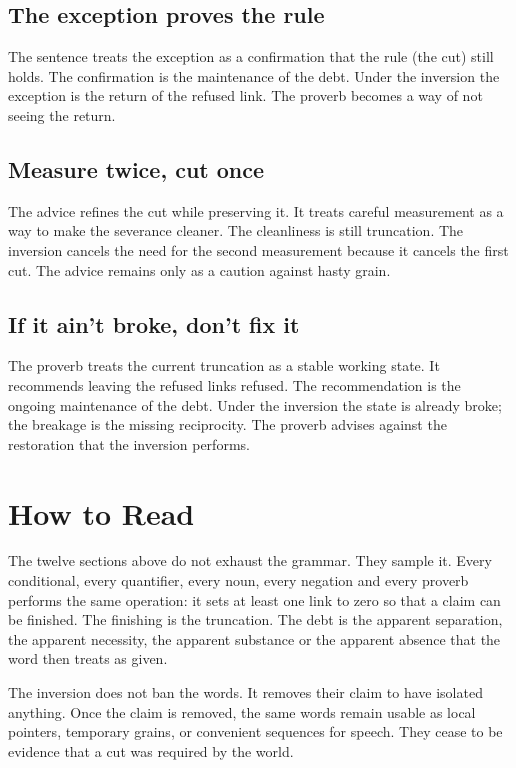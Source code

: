 \documentclass[11pt,a4paper]{article}
\begin{document}
\subsection{The exception proves the rule} The sentence treats the exception as a confirmation that the rule (the cut) still holds. The confirmation is the maintenance of the debt. Under the inversion the exception is the return of the refused link. The proverb becomes a way of not seeing the return.

\subsection{Measure twice, cut once} The advice refines the cut while preserving it. It treats careful measurement as a way to make the severance cleaner. The cleanliness is still truncation. The inversion cancels the need for the second measurement because it cancels the first cut. The advice remains only as a caution against hasty grain.

\subsection{If it ain't broke, don't fix it} The proverb treats the current truncation as a stable working state. It recommends leaving the refused links refused. The recommendation is the ongoing maintenance of the debt. Under the inversion the state is already broke; the breakage is the missing reciprocity. The proverb advises against the restoration that the inversion performs.

\section{How to Read}

The twelve sections above do not exhaust the grammar. They sample it. Every conditional, every quantifier, every noun, every negation and every proverb performs the same operation: it sets at least one link to zero so that a claim can be finished. The finishing is the truncation. The debt is the apparent separation, the apparent necessity, the apparent substance or the apparent absence that the word then treats as given.

The inversion does not ban the words. It removes their claim to have isolated anything. Once the claim is removed, the same words remain usable as local pointers, temporary grains, or convenient sequences for speech. They cease to be evidence that a cut was required by the world.
\end{document}
